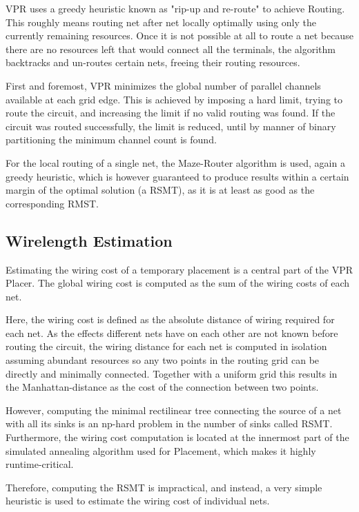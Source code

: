 \gls{VPR} uses a greedy heuristic known as "rip-up and re-route" to achieve Routing. This roughly means routing net after net locally optimally using only the currently remaining resources. Once it is not possible at all to route a net because there are no resources left that would connect all the terminals, the algorithm backtracks and un-routes certain nets, freeing their routing resources.\cite{vtr8}

First and foremost, \gls{VPR} minimizes the global number of parallel channels available at each grid edge. This is achieved by imposing a hard limit, trying to route the circuit, and increasing the limit if no valid routing was found. If the circuit was routed successfully, the limit is reduced, until by manner of binary partitioning the minimum channel count is found.

For the local routing of a single net, the Maze-Router\cite{Maze-Router} algorithm is used, again a greedy heuristic, which is however guaranteed to produce results within a certain margin of the optimal solution (a \gls{RSMT}), as it is at least as good as the corresponding \gls{RMST}.\cite{rmst-quality}

\subsection{Wirelength Estimation}

Estimating the wiring cost of a temporary placement is a central part of the \gls{VPR} Placer. The global wiring cost is computed as the sum of the wiring costs of each net.

Here, the wiring cost is defined as the absolute distance of wiring required for each net. As the effects different nets have on each other are not known before routing the circuit, the wiring distance for each net is computed in isolation assuming abundant resources so any two points in the routing grid can be directly and minimally connected. Together with a uniform grid this results in the Manhattan-distance as the cost of the connection between two points.

However, computing the minimal rectilinear tree connecting the source of a net with all its sinks is an np-hard problem in the number of sinks called \gls{RSMT}.\cite{rsmt-complexity} Furthermore, the wiring cost computation is located at the innermost part of the simulated annealing algorithm used for Placement, which makes it highly runtime-critical.

Therefore, computing the \gls{RSMT} is impractical, and instead, a very simple heuristic is used to estimate the wiring cost of individual nets.

